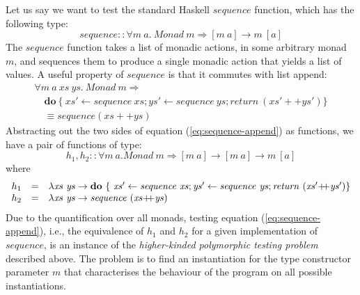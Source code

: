 \documentclass{llncs}
\begin{document}

Let us say we want to test the standard Haskell $\mathit{sequence}$
function, which has the following type:
\begin{displaymath}
  \mathit{sequence} :: \forall m~a.~\mathit{Monad}~m \Rightarrow [m~a] \to m~[a]
\end{displaymath}
The $\mathit{sequence}$ function takes a list of monadic actions, in
some arbitrary monad $m$, and sequences them to produce a single
monadic action that yields a list of values. A useful property of
$\mathit{sequence}$ is that it commutes with list append:
\begin{equation}\label{eq:sequence-append}
  \begin{array}{l}
    \forall m~a~\mathit{xs}~\mathit{ys}.~\mathit{Monad}~m \Rightarrow \\
    \quad \mathbf{do}~\{~\mathit{xs'} \leftarrow \mathit{sequence}~\mathit{xs}; \mathit{ys'} \leftarrow \mathit{sequence}~\mathit{ys}; \mathit{return}~(\mathit{xs'}++\mathit{ys'}) \} \\
    \quad \equiv \mathit{sequence} (\mathit{xs}++\mathit{ys})
  \end{array}
\end{equation}
Abstracting out the two sides of equation (\ref{eq:sequence-append})
as functions, we have a pair of functions of type:
\begin{displaymath}
  h_1, h_2 :: \forall m~a. \mathit{Monad}~m \Rightarrow [m~a] \to [m~a] \to m~[a]
\end{displaymath}
where
\begin{displaymath}
  \begin{array}{lcl}
    h_1&=&\lambda \mathit{xs}~\mathit{ys} \to \mathbf{do}~\{~\mathit{xs'} \leftarrow \mathit{sequence}~\mathit{xs}; \mathit{ys'} \leftarrow \mathit{sequence}~\mathit{ys}; \mathit{return}~(\mathit{xs'}\mathit{+\kern-3pt+}\mathit{ys'}) \} \\
    h_2&=&\lambda \mathit{xs}~\mathit{ys} \to \mathit{sequence}~(\mathit{xs}\mathit{+\kern-3pt+}\mathit{ys})
  \end{array}
\end{displaymath}
Due to the quantification over all monads, testing equation
(\ref{eq:sequence-append}), i.e., the equivalence of $h_1$ and $h_2$
for a given implementation of $\mathit{sequence}$, is an instance of
the \emph{higher-kinded polymorphic testing problem} described
above. %
The problem is to find an instantiation for the type constructor
parameter $m$ that characterises the behaviour of the program on all
possible instantiations.
\end{document}
